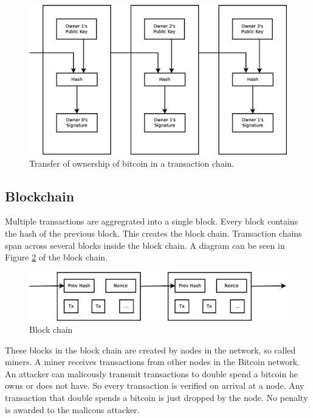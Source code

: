 \begin{figure}
	\centerline{\includegraphics[scale=0.3]{relatedWork/figs/transactions.eps}}
	\caption{Transfer of ownership of bitcoin in a transaction chain.}
	\label{fig:transaction-chain}
\end{figure}

\subsection{Blockchain}
Multiple transactions are aggregrated into a single block.
Every block contains the hash of the previous block.
This creates the block chain.
Transaction chains span across several blocks inside the block chain.
A diagram can be seen in Figure \ref{fig:block-chain} of the block chain.

\begin{figure}
        \centerline{\includegraphics[scale=0.3]{relatedWork/figs/blocks.eps}}
        \caption{Block chain}
        \label{fig:block-chain}
\end{figure}

These blocks in the block chain are created by nodes in the network, so called miners.
A miner receives transactions from other nodes in the Bitcoin network.
An attacker can malicously transmit transactions to double spend a bitcoin he owns or does not have.
So every transaction is verified on arrival at a node.
Any transaction that double spends a bitcoin is just dropped by the node.
No penalty is awarded to the malicous attacker.

